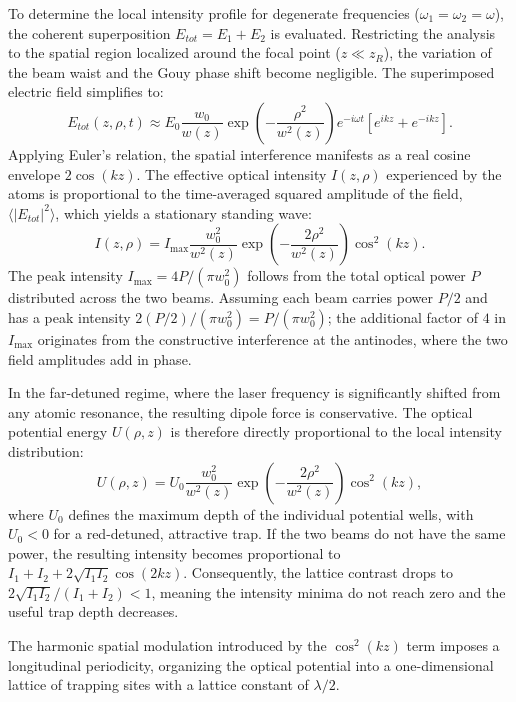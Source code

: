 To determine the local intensity profile for degenerate frequencies ($\omega_1 = \omega_2 = \omega$), the coherent superposition $E_{tot} = E_1 + E_2$ is evaluated. Restricting the analysis to the spatial region localized around the focal point ($z \ll z_R$), the variation of the beam waist and the Gouy phase shift become negligible. The superimposed electric field simplifies to:
\begin{equation}
E_{tot}(z, \rho, t) \approx E_0 \frac{w_0}{w(z)} \exp\left(-\frac{\rho^2}{w^2(z)}\right) e^{-i\omega t} \left[ e^{ikz} + e^{-ikz} \right].
\end{equation}
Applying Euler's relation, the spatial interference manifests as a real cosine envelope $2\cos(kz)$. The effective optical intensity $I(z, \rho)$ experienced by the atoms is proportional to the time-averaged squared amplitude of the field, $\langle |E_{tot}|^2 \rangle$, which yields a stationary standing wave:
\begin{equation}
I(z,\rho) = I_{\max} \frac{w_0^2}{w^2(z)} \exp\left(-\frac{2\rho^2}{w^2(z)}\right) \cos^2(kz).
\label{eq:stationary_intensity}
\end{equation}
The peak intensity $I_{\max} = 4P/(\pi w_0^2)$ follows from the total optical power $P$ distributed across the two beams. Assuming each beam carries power $P/2$ and has a peak intensity $2(P/2)/(\pi w_0^2) = P/(\pi w_0^2)$; the additional factor of $4$ in $I_{\max}$ originates from the constructive interference at the antinodes, where the two field amplitudes add in phase.

In the far-detuned regime, where the laser frequency is significantly shifted from any atomic resonance, the resulting dipole force is conservative. The optical potential energy $U(\rho,z)$ is therefore directly proportional to the local intensity distribution:
\begin{equation}
U(\rho,z) = U_0 \frac{w_0^2}{w^2(z)} \exp\left(-\frac{2\rho^2}{w^2(z)}\right) \cos^2(kz),
\label{eq:stationary_potential}
\end{equation}
where $U_0$ defines the maximum depth of the individual potential wells, with $U_0 < 0$ for a red-detuned, attractive trap.
If the two beams do not have the same power, the resulting intensity becomes proportional to $I_1 + I_2 + 2\sqrt{I_1 I_2} \cos(2kz)$. Consequently, the lattice contrast drops to $2\sqrt{I_1 I_2}/(I_1 + I_2) < 1$, meaning the intensity minima do not reach zero and the useful trap depth decreases.

The harmonic spatial modulation introduced by the $\cos^2(kz)$ term imposes a longitudinal periodicity, organizing the optical potential into a one-dimensional lattice of trapping sites with a lattice constant of $\lambda/2$.

